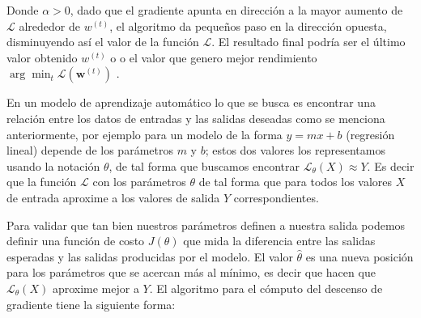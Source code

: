 Donde $ \alpha > 0$, dado que el gradiente apunta en  dirección a la mayor aumento de $\mathcal{L}$ alrededor de $w^{(t)}$, el algoritmo da pequeños paso en la dirección opuesta, disminuyendo así el valor de la función $\mathcal{L}$. El resultado final podría ser el último valor obtenido $w^{(t)}$ o o el valor que genero mejor rendimiento $\arg\min_{t}\mathcal{L}(\textbf{w}^{(t)})$ \citep{gradient_des}.


En un modelo de aprendizaje automático lo que se busca es encontrar una relación entre los datos de entradas y las salidas deseadas como se menciona anteriormente, por ejemplo para un modelo de la forma $y= mx+b$ (regresión lineal) depende de los parámetros  $m$ y $b$;  estos dos valores los representamos usando la notación $\theta$, de tal forma que buscamos encontrar $\mathcal{L}_{\theta} (X) \approx Y$. Es decir que la función $\mathcal{L}$ con los parámetros $\theta$ de tal forma que para todos los valores $X$ de entrada aproxime a los valores de salida $Y$ correspondientes. 

Para validar que tan bien nuestros parámetros definen a nuestra salida podemos definir una función de costo $J(\theta)$ que mida la diferencia entre las salidas esperadas y las salidas producidas por el modelo. El valor $\hat\theta$ es una nueva posición para los parámetros que se acercan más al mínimo, es decir que hacen que $\mathcal{L}_\theta(X)$ aproxime mejor a $Y$. El algoritmo para el cómputo del descenso de gradiente tiene la siguiente forma:



	

